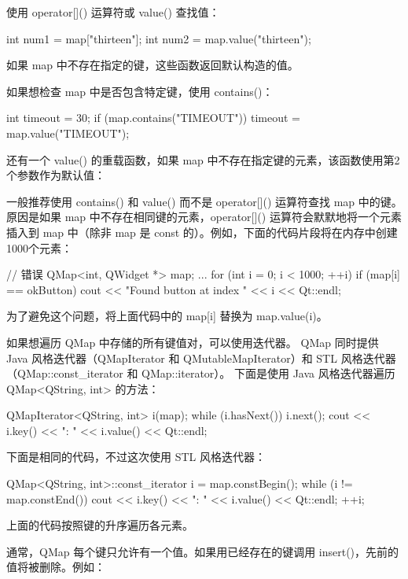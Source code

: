 使用 operator[]() 运算符或 value() 查找值：

\begin{cppcode}
int num1 = map["thirteen"];
int num2 = map.value("thirteen");
\end{cppcode}

如果 map 中不存在指定的键，这些函数返回默认构造的值。

如果想检查 map 中是否包含特定键，使用 contains()：

\begin{cppcode}
int timeout = 30;
if (map.contains("TIMEOUT"))
    timeout = map.value("TIMEOUT");
\end{cppcode}

还有一个 value() 的重载函数，如果 map 中不存在指定键的元素，该函数使用第2个参数作为默认值：


一般推荐使用 contains() 和 value() 而不是 operator[]() 运算符查找 map 中的键。原因是如果 map 中不存在相同键的元素，operator[]() 运算符会默默地将一个元素插入到 map 中（除非 map 是 const 的）。例如，下面的代码片段将在内存中创建1000个元素：

\begin{cppcode}
// 错误
QMap<int, QWidget *> map;
...
for (int i = 0; i < 1000; ++i) {
    if (map[i] == okButton)
        cout << "Found button at index " << i << Qt::endl;
}
\end{cppcode}

为了避免这个问题，将上面代码中的 map[i] 替换为 map.value(i)。

如果想遍历 QMap 中存储的所有键值对，可以使用迭代器。
QMap 同时提供 Java 风格迭代器（QMapIterator 和 QMutableMapIterator）和 STL 风格迭代器（QMap::const\_iterator 和 QMap::iterator）。
下面是使用 Java 风格迭代器遍历 QMap<QString, int> 的方法：

\begin{cppcode}
QMapIterator<QString, int> i(map);
while (i.hasNext()) {
    i.next();
    cout << i.key() << ": " << i.value() << Qt::endl;
}
\end{cppcode}

下面是相同的代码，不过这次使用 STL 风格迭代器：

\begin{cppcode}
QMap<QString, int>::const_iterator i = map.constBegin();
while (i != map.constEnd()) {
    cout << i.key() << ": " << i.value() << Qt::endl;
    ++i;
}
\end{cppcode}

上面的代码按照键的升序遍历各元素。

通常，QMap 每个键只允许有一个值。如果用已经存在的键调用 insert()，先前的值将被删除。例如：


